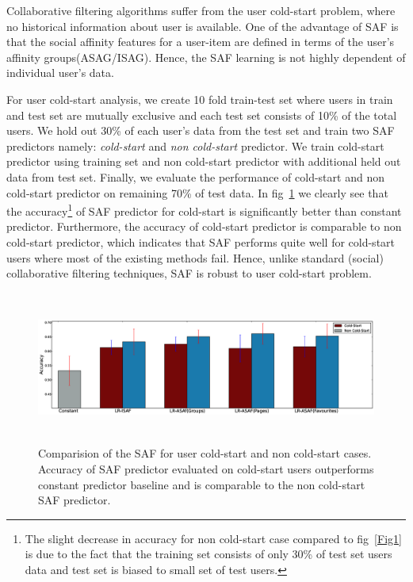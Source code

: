 Collaborative filtering algorithms suffer from the user cold-start problem,
where no historical information about user is available. One of the advantage of SAF is that 
the social affinity features for a user-item are defined in terms of the user's affinity groups(ASAG/ISAG).
Hence, the SAF learning is not highly dependent of individual user's data. 

For user cold-start analysis, we create 10 fold train-test set where users in train and test set are mutually exclusive
and each test set consists of 10\% of the total users. We hold out 30\% of each user's data from the test set 
and train two SAF predictors namely: \textit{cold-start} and \textit{non cold-start} predictor.
We train cold-start predictor using training set and non cold-start predictor with additional 
held out data from test set. Finally, we evaluate the performance of cold-start and non cold-start predictor on remaining 70\% 
of test data. In fig~\ref{fig:coldstart} we clearly see that the accuracy\footnote{ The slight decrease in accuracy for non cold-start case compared to 
fig~\ref{Fig1} is due to the fact that the training set consists of only 30\% of test set users data and test 
set is biased to small set of test users.}  of  SAF predictor for cold-start is significantly better than constant predictor. Furthermore, the accuracy
of cold-start predictor is comparable to non cold-start predictor, which indicates that SAF performs quite well for cold-start users where most of the
existing methods fail.  Hence, unlike standard (social) collaborative filtering techniques, SAF is robust to user 
cold-start problem.  


\begin{figure}[tbp!]
\centering
\includegraphics[width=180mm,height=50mm]{data/plots/new/cold_start.eps}
\vspace{-3mm}
\caption{Comparision of the SAF for user cold-start and non cold-start cases. Accuracy of SAF predictor evaluated on
cold-start users outperforms constant predictor baseline and is comparable to the non cold-start SAF predictor.}
\label{fig:coldstart}
\end{figure}
 
